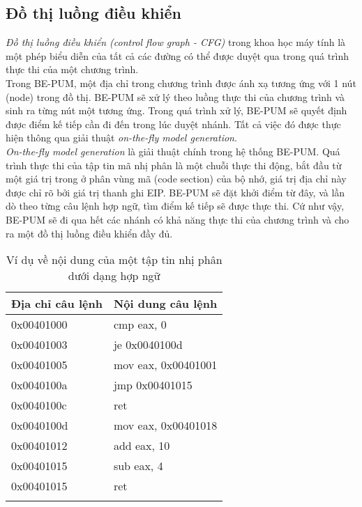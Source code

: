 	\subsection{Đồ thị luồng điều khiển}

\textit{Đồ thị luồng điều khiển (control flow graph - CFG)} trong khoa học máy tính là một phép biểu diễn của tất cả các đường có thể được duyệt qua trong quá trình thực thi của một chương trình. \cite{cfg-def}\\

Trong BE-PUM, một địa chỉ trong chương trình được ánh xạ tương ứng với 1 nút (node) trong đồ thị. BE-PUM sẽ xử lý theo luồng thực thi của chương trình và sinh ra từng nút một tương ứng. Trong quá trình xử lý, BE-PUM sẽ quyết định được điểm kế tiếp cần đi đến trong lúc duyệt nhánh. Tất cả việc đó được thực hiện thông qua giải thuật \textit{on-the-fly model generation}.\\

\textit{On-the-fly model generation} là giải thuật chính trong hệ thống BE-PUM. Quá trình thực thi của tập tin mã nhị phân là một chuỗi thực thi động, bắt đầu từ một giá trị trong ở phân vùng mã (code section) của bộ nhớ, giá trị địa chỉ này được chỉ rõ bởi giá trị thanh ghi EIP. BE-PUM sẽ đặt khởi điểm từ đây, và lần dò theo từng câu lệnh hợp ngữ, tìm điểm kế tiếp sẽ được thực thi. Cứ như vậy, BE-PUM sẽ đi qua hết các nhánh có khả năng thực thi của chương trình và cho ra một đồ thị luồng điều khiển đầy đủ.

\begin{longtable}{ | m{3cm} | m{5cm} | }
	\hline
Địa chỉ câu lệnh & Nội dung câu lệnh\\
	\hline
	\hline
0x00401000 & cmp eax, 0 \\
	\hline
0x00401003	& je 0x0040100d \\
	\hline
0x00401005 & mov eax, 0x00401001 \\
	\hline
0x0040100a & jmp 0x00401015 \\
	\hline
0x0040100c & ret \\
	\hline
0x0040100d & mov eax, 0x00401018 \\
	\hline
0x00401012 & add eax, 10 \\
	\hline
0x00401015 & sub eax, 4 \\
	\hline
0x00401015 & ret \\
	\hline

\caption{Ví dụ về nội dung của một tập tin nhị phân dưới dạng hợp ngữ}
\label{table:tblexcfg}
\end{longtable}

